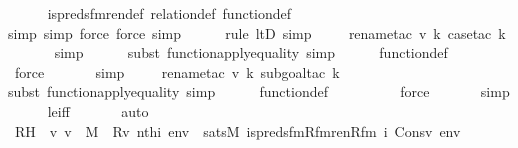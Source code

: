 \begin{isabellebody}
\ \ \ \ \isamarkupfalse%
\ is{\isacharunderscore}{\kern0pt}preds{\isacharunderscore}{\kern0pt}fm{\isacharunderscore}{\kern0pt}ren{\isacharunderscore}{\kern0pt}def\ relation{\isacharunderscore}{\kern0pt}def\ function{\isacharunderscore}{\kern0pt}def\isanewline
\ \ \ \ \ \ \ \ \isamarkupfalse%
{\isacharparenleft}{\kern0pt}simp{\isacharcomma}{\kern0pt}\ simp{\isacharcomma}{\kern0pt}\ force{\isacharcomma}{\kern0pt}\ force{\isacharcomma}{\kern0pt}\ simp{\isacharparenright}{\kern0pt}\isanewline
\ \ \ \ \ \isamarkupfalse%
{\isacharparenleft}{\kern0pt}rule\ ltD{\isacharcomma}{\kern0pt}\ simp{\isacharparenright}{\kern0pt}\isanewline
\ \ \ \ \isamarkupfalse%
{\isacharparenleft}{\kern0pt}rename{\isacharunderscore}{\kern0pt}tac\ v\ k{\isacharcomma}{\kern0pt}\ case{\isacharunderscore}{\kern0pt}tac\ {\isachardoublequoteopen}k{\isacharequal}{\kern0pt}{}{\isachardoublequoteclose}{\isacharparenright}{\kern0pt}\isanewline
\ \ \ \ \ \isamarkupfalse%
\ simp\isanewline
\ \ \ \ \ \isamarkupfalse%
{\isacharparenleft}{\kern0pt}subst\ function{\isacharunderscore}{\kern0pt}apply{\isacharunderscore}{\kern0pt}equality{\isacharcomma}{\kern0pt}\ simp{\isacharparenright}{\kern0pt}\isanewline
\ \ \ \ \isamarkupfalse%
\ function{\isacharunderscore}{\kern0pt}def\ \ \isanewline
\ \ \ \ \ \ \isamarkupfalse%
\ force\isanewline
\ \ \ \ \ \isamarkupfalse%
\ simp\isanewline
\ \ \ \ \isamarkupfalse%
{\isacharparenleft}{\kern0pt}rename{\isacharunderscore}{\kern0pt}tac\ v\ k{\isacharcomma}{\kern0pt}\ subgoal{\isacharunderscore}{\kern0pt}tac\ {\isachardoublequoteopen}k{\isacharequal}{\kern0pt}{}{\isachardoublequoteclose}{\isacharparenright}{\kern0pt}\isanewline
\ \ \ \ \ \isamarkupfalse%
{\isacharparenleft}{\kern0pt}subst\ function{\isacharunderscore}{\kern0pt}apply{\isacharunderscore}{\kern0pt}equality{\isacharcomma}{\kern0pt}\ simp{\isacharparenright}{\kern0pt}\isanewline
\ \ \ \ \isamarkupfalse%
\ function{\isacharunderscore}{\kern0pt}def\ \ \isanewline
\ \ \ \ \ \ \isamarkupfalse%
\ force\isanewline
\ \ \ \ \ \isamarkupfalse%
\ simp\isanewline
\ \ \ \ \isamarkupfalse%
\ le{\isacharunderscore}{\kern0pt}iff\ \isanewline
\ \ \ \ \isamarkupfalse%
\ auto\isanewline
\ \ \isamarkupfalse%
\ RH\ {\isacharcolon}{\kern0pt}\ {\isachardoublequoteopen}{\isasymAnd}v{\isachardot}{\kern0pt}\ v\ {\isasymin}\ M\ {\isasymLongrightarrow}\ R{\isacharparenleft}{\kern0pt}v{\isacharcomma}{\kern0pt}\ nth{\isacharparenleft}{\kern0pt}i{\isacharcomma}{\kern0pt}\ env{\isacharparenright}{\kern0pt}{\isacharparenright}{\kern0pt}\ {\isasymlongleftrightarrow}\ sats{\isacharparenleft}{\kern0pt}M{\isacharcomma}{\kern0pt}\ is{\isacharunderscore}{\kern0pt}preds{\isacharunderscore}{\kern0pt}fm{\isacharunderscore}{\kern0pt}Rfm{\isacharunderscore}{\kern0pt}ren{\isacharparenleft}{\kern0pt}Rfm{\isacharcomma}{\kern0pt}\ i{\isacharparenright}{\kern0pt}{\isacharcomma}{\kern0pt}\ Cons{\isacharparenleft}{\kern0pt}v{\isacharcomma}{\kern0pt}\ env{\isacharparenright}{\kern0pt}{\isacharparenright}{\kern0pt}{\isachardoublequoteclose}\isanewline

\end{isabellebody}
